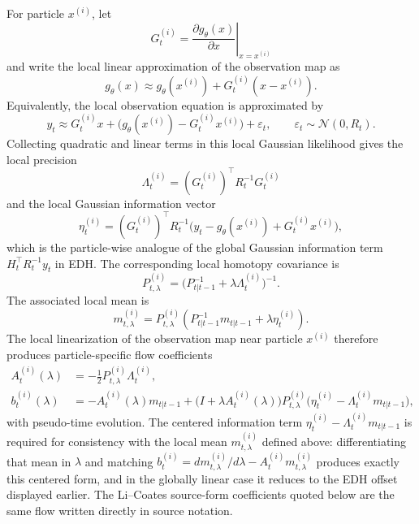 For particle $x^{(i)}$, let
\begin{equation}
\label{eq:bf-pff-local-jacobian}
  G_t^{(i)} = \left.\frac{\partial g_\theta(x)}{\partial x}\right|_{x=x^{(i)}}
\end{equation}
and write the local linear approximation of the observation map as
\begin{equation}
\label{eq:bf-pff-local-linearization}
  g_\theta(x)
  \approx g_\theta(x^{(i)}) + G_t^{(i)}(x-x^{(i)}).
\end{equation}
Equivalently, the local observation equation is approximated by
\[
  y_t
  \approx
  G_t^{(i)}x
  +
  \bigl(g_\theta(x^{(i)})-G_t^{(i)}x^{(i)}\bigr)
  +
  \varepsilon_t,
  \qquad
  \varepsilon_t\sim\mathcal N(0,R_t).
\]
Collecting quadratic and linear terms in this local Gaussian likelihood gives
the local precision
\begin{equation}
\label{eq:bf-pff-local-precision}
  \Lambda_t^{(i)} = (G_t^{(i)})^\top R_t^{-1} G_t^{(i)}
\end{equation}
and the local Gaussian information vector
\begin{equation}
\label{eq:bf-pff-local-information-vector}
  \eta_t^{(i)}
  = (G_t^{(i)})^\top R_t^{-1}
    \bigl(y_t - g_\theta(x^{(i)}) + G_t^{(i)}x^{(i)}\bigr),
\end{equation}
which is the particle-wise analogue of the global Gaussian information term
$H_t^\top R_t^{-1}y_t$ in EDH.  The corresponding local homotopy covariance is
\begin{equation}
\label{eq:bf-pff-local-homotopy-covariance}
  P_{t,\lambda}^{(i)}
  = \bigl(P_{t|t-1}^{-1} + \lambda \Lambda_t^{(i)}\bigr)^{-1}.
\end{equation}
The associated local mean is
\[
  m_{t,\lambda}^{(i)}
  =
  P_{t,\lambda}^{(i)}
  \left(P_{t|t-1}^{-1}m_{t|t-1}
  +\lambda\eta_t^{(i)}\right).
\]
The local linearization of the observation map near particle $x^{(i)}$ therefore
produces particle-specific flow coefficients
\begin{align}
\label{eq:bf-pff-ledh-A}
  A_t^{(i)}(\lambda)
  &= -\frac{1}{2} P_{t,\lambda}^{(i)} \Lambda_t^{(i)}, \\
\label{eq:bf-pff-ledh-b}
  b_t^{(i)}(\lambda)
  &= -A_t^{(i)}(\lambda)m_{t|t-1}
     + \bigl(I + \lambda A_t^{(i)}(\lambda)\bigr)
       P_{t,\lambda}^{(i)}
       \bigl(\eta_t^{(i)}-\Lambda_t^{(i)}m_{t|t-1}\bigr),
\end{align}
with pseudo-time evolution.  The centered information term
$\eta_t^{(i)}-\Lambda_t^{(i)}m_{t|t-1}$ is required for consistency with the
local mean $m_{t,\lambda}^{(i)}$ defined above: differentiating that mean in
$\lambda$ and matching $b_t^{(i)}=dm_{t,\lambda}^{(i)}/d\lambda
-A_t^{(i)}m_{t,\lambda}^{(i)}$ produces exactly this centered form, and in the
globally linear case it reduces to the EDH offset displayed earlier.  The
Li--Coates source-form coefficients quoted below are the same flow written
directly in source notation.

